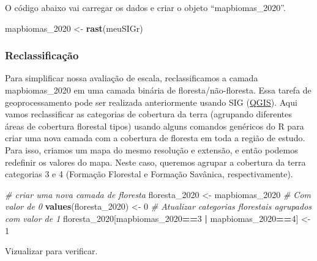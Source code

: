 \documentclass[
]{article}
\newenvironment{Shaded}{\begin{snugshade}}{\end{snugshade}}
\newcommand{\CommentTok}[1]{\textcolor[rgb]{0.56,0.35,0.01}{\textit{#1}}}
\newcommand{\DecValTok}[1]{\textcolor[rgb]{0.00,0.00,0.81}{#1}}
\newcommand{\FunctionTok}[1]{\textcolor[rgb]{0.13,0.29,0.53}{\textbf{#1}}}
\newcommand{\NormalTok}[1]{#1}
\newcommand{\OtherTok}[1]{\textcolor[rgb]{0.56,0.35,0.01}{#1}}
\newcommand{\SpecialCharTok}[1]{\textcolor[rgb]{0.81,0.36,0.00}{\textbf{#1}}}
\begin{document}
O código abaixo vai carregar os dados e criar o objeto ``mapbiomas\_2020''.

\begin{Shaded}
\begin{Highlighting}[]
\NormalTok{mapbiomas\_2020 }\OtherTok{\textless{}{-}} \FunctionTok{rast}\NormalTok{(meuSIGr)}
\end{Highlighting}
\end{Shaded}

\newpage

\hypertarget{reclassificauxe7uxe3o-1}{%
\subsubsection{Reclassificação}\label{reclassificauxe7uxe3o-1}}

Para simplificar nossa avaliação de escala, reclassificamos a camada mapbiomas\_2020 em uma camada binária de floresta/não-floresta. Essa tarefa de geoprocessamento pode ser realizada anteriormente usando SIG (\href{https://docs.qgis.org/3.22/pt_BR/docs/training_manual/rasters/terrain_analysis.html\#moderate-fa-reclassifying-the-raster}{QGIS}). Aqui vamos reclassificar as categorias de cobertura da terra (agrupando diferentes áreas de cobertura florestal tipos) usando alguns comandos genéricos do R para criar uma nova camada com a cobertura de floresta em toda a região de estudo. Para isso, criamos um mapa do mesmo resolução e extensão, e então podemos redefinir os valores do mapa. Neste caso, queremos agrupar a cobertura da terra categorias 3 e 4 (Formação Florestal e Formação Savânica, respectivamente).

\begin{Shaded}
\begin{Highlighting}[]
\CommentTok{\# criar uma nova camada de floresta}
\NormalTok{floresta\_2020 }\OtherTok{\textless{}{-}}\NormalTok{ mapbiomas\_2020}
\CommentTok{\# Com valor de 0}
\FunctionTok{values}\NormalTok{(floresta\_2020) }\OtherTok{\textless{}{-}} \DecValTok{0}
\CommentTok{\# Atualizar categorias florestais agrupados com valor de 1}
\NormalTok{floresta\_2020[mapbiomas\_2020}\SpecialCharTok{==}\DecValTok{3} \SpecialCharTok{|}\NormalTok{ mapbiomas\_2020}\SpecialCharTok{==}\DecValTok{4}\NormalTok{] }\OtherTok{\textless{}{-}} \DecValTok{1} 
\end{Highlighting}
\end{Shaded}

\newpage

Vizualizar para verificar.
\end{document}
